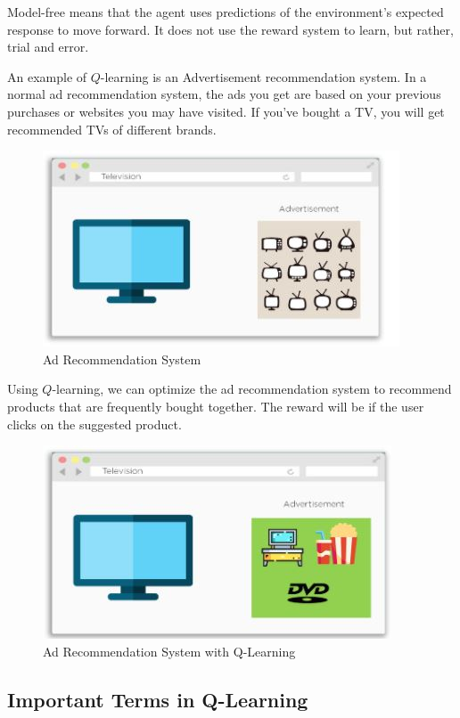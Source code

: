 Model-free means that the agent uses predictions of the environment's expected response 
to move forward. It does not use the reward system to learn, but rather, trial and error.

An example of $Q$-learning is an Advertisement recommendation system. In a normal ad 
recommendation system, the ads you get are based on your previous purchases or websites 
you may have visited. If you've bought a TV, you will get recommended TVs of different 
brands. 

\begin{figure}[!htb]
\centering
\includegraphics[scale=0.618]{pix/q_learning/4-adrecommend.jpg}
\caption{Ad Recommendation System}
\end{figure}

Using $Q$-learning, we can optimize the ad recommendation system to recommend products 
that are frequently bought together. The reward will be if the user clicks on the 
suggested product.

\begin{figure}[!htb]
\centering
\includegraphics[scale=0.618]{pix/q_learning/5-ad-q.jpg}
\caption{Ad Recommendation System with Q-Learning}
\end{figure}


\subsection{Important Terms in Q-Learning}


